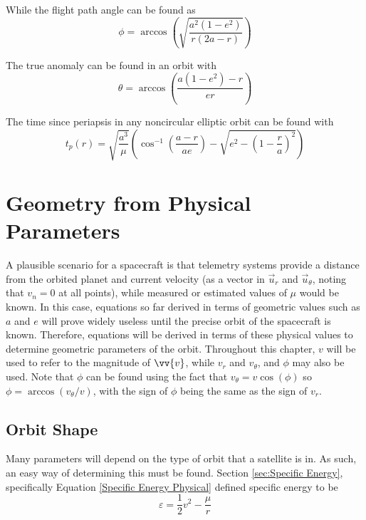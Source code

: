 \documentclass{article}
\begin{document}
\bigskip
While the flight path angle can be found as
$$\phi=\arccos\left(\sqrt{\frac{a^2(1-e^2)}{r(2a-r)}}\right)$$

\bigskip
The true anomaly can be found in an orbit with
$$\theta=\arccos\left(\frac{a(1-e^2)-r}{er}\right)$$

\bigskip
The time since periapsis in any noncircular elliptic orbit can be found with
$$t_p(r)=\sqrt{\frac{a^3}{\mu}}\left(\cos^{-1}\left(\frac{a-r}{ae}\right)- \sqrt{e^2-\left(1-\frac{r}{a}\right)^2}\right)$$
\pagebreak
\section{Geometry from Physical Parameters}

A plausible scenario for a spacecraft is that telemetry systems provide a distance from the orbited planet and current velocity (as a vector in $\vec{u}_r$ and $\vec{u}_\theta$, noting that $v_n=0$ at all points), while measured or estimated values of $\mu$ would be known. In this case, equations so far derived in terms of geometric values such as $a$ and $e$ will prove widely useless until the precise orbit of the spacecraft is known. Therefore, equations will be derived in terms of these physical values to determine geometric parameters of the orbit. Throughout this chapter, $v$ will be used to refer to the magnitude of $\vv{v}$, while $v_r$ and $v_\theta$, and $\phi$ may also be used. Note that $\phi$ can be found using the fact that $v_\theta=v\cos(\phi)$ so $\phi=\arccos(v_\theta/v)$, with the sign of $\phi$ being the same as the sign of $v_r$.

\bigskip\bigskip
\subsection{Orbit Shape}

Many parameters will depend on the type of orbit that a satellite is in. As such, an easy way of determining this must be found. Section \ref{sec:Specific Energy}, specifically Equation \eqref{Specific Energy Physical} defined specific energy to be
$$\varepsilon=\frac{1}{2}v^2-\frac{\mu}{r}$$
\end{document}

